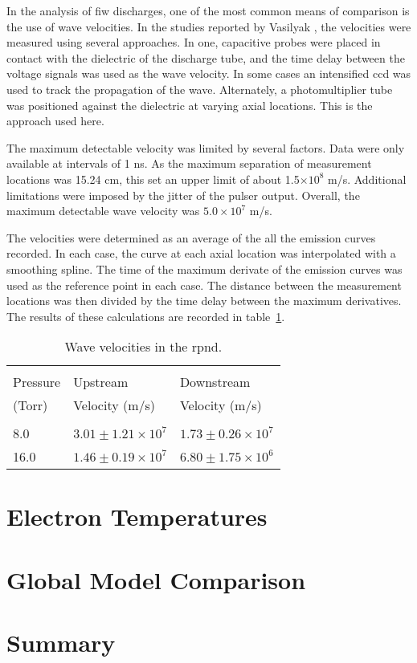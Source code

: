 In the analysis of \acs{fiw} discharges, one of the most common means of
comparison is the use of wave velocities. In the studies reported by Vasilyak
\cite{Vasilyak1994}, the velocities were measured using several approaches. In
one, capacitive probes were placed in contact with the dielectric of the
discharge tube, and the time delay between the voltage signals was used as the
wave velocity. In some cases an intensified \acs{ccd} was used to track the
propagation of the wave. Alternately, a photomultiplier tube was positioned
against the dielectric at varying axial locations. This is the approach used
here.

The maximum detectable velocity was limited by several factors. Data were only
available at intervals of 1 ns. As the maximum separation of measurement
locations was 15.24 cm, this set an upper limit of about 1.5$\times10^8$ m/s.
Additional limitations were imposed by the jitter of the pulser output. Overall,
the maximum detectable wave velocity was $5.0\times10^7$ m/s.

The velocities were determined as an average of the all the emission curves
recorded. In each case, the curve at each axial location was interpolated with a
smoothing spline. The time of the maximum derivate of the emission curves was
used as the reference point in each case. The distance between the measurement
locations was then divided by the time delay between the maximum derivatives.
The results of these calculations are recorded in table~\ref{tbl:velocities}.
\begin{table}
  \centering
  \caption{Wave velocities in the \acs{rpnd}.}
  \label{tbl:velocities}
  \begin{tabular}{lll}
    \toprule                                                      \\
    Pressure  & Upstream                & Downstream              \\
    (Torr)    & Velocity (m/s)          & Velocity (m/s)          \\
    \midrule                                                      \\
    8.0       & $3.01\pm1.21\times10^7$ & $1.73\pm0.26\times10^7$ \\
    16.0      & $1.46\pm0.19\times10^7$ & $6.80\pm1.75\times10^6$ \\
  \end{tabular}
\end{table}


\section{Electron Temperatures}



\section{Global Model Comparison}



\section{Summary}

